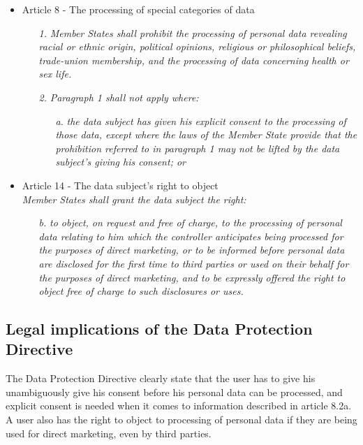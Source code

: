 \documentclass[11pt]{article}
\newcommand{\DPD}{Data Protection Directive }
\begin{document}
\begin{itemize}
	\item Article 8 - The processing of special categories of data\\
		\begin{itemize}
			\item  [\textit{1.}] {\it Member States shall prohibit the processing of personal data revealing racial or ethnic origin, political opinions, religious or philosophical beliefs, trade-union membership, and the processing of data concerning health or sex life.}
			\item  [\textit{2.}] {\it Paragraph 1 shall not apply where:}
			\begin{itemize}
				\item  [\textit{a.}] {\it the data subject has given his explicit consent to the processing of those data, except where the laws of the Member State provide that the prohibition referred to in paragraph 1 may not be lifted by the data subject's giving his consent; or}		\end{itemize}

		\end{itemize}

	\item Article 14 - The data subject's right to object\\
		\emph{Member States shall grant the data subject the right:}
		\begin{itemize}
			\item  [\textit{b.}] {\it to object, on request and free of charge, to the processing of personal data relating to him which the controller anticipates being processed for the purposes of direct marketing, or to be informed before personal data are disclosed for the first time to third parties or used on their behalf for the purposes of direct marketing, and to be expressly offered the right to object free of charge to such disclosures or uses.}
		\end{itemize}
		

\end{itemize}

\subsection{Legal implications of the \DPD}
The \DPD clearly state that the user has to give his unambiguously give his consent before his personal data can be processed, and explicit consent is needed when it comes to information described in article 8.2a. A user also has the right to object to processing of personal data if they are being used for direct marketing, even by third parties. 
\end{document}
